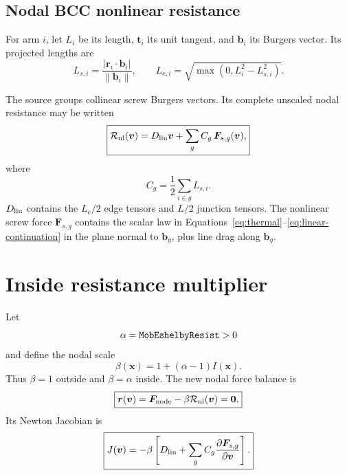 \documentclass[11pt]{article}
\newcommand{\vect}[1]{\bm{#1}}
\newcommand{\norm}[1]{\left\lVert #1\right\rVert}
\newcommand{\abs}[1]{\left\lvert #1\right\rvert}
\newcommand{\code}[1]{\texttt{\detokenize{#1}}}
\begin{document}
\subsection{Nodal BCC nonlinear resistance}

For arm \(i\), let \(L_i\) be its length, \(\vect{t}_i\) its unit tangent,
and \(\vect b_i\) its Burgers vector.  Its projected lengths are
\begin{equation}
 L_{s,i}=\frac{\abs{\vect r_i\mathbin{\cdot}\vect b_i}}
                     {\norm{\vect b_i}},
 \qquad
 L_{e,i}=\sqrt{\max(0,L_i^2-L_{s,i}^2)}.
\end{equation}

The source groups collinear screw Burgers vectors.  Its complete unscaled
nodal resistance may be written
\begin{equation}
 \boxed{
 \mathcal R_{\rm nl}(\vect v)
 =D_{\rm lin}\vect v+
  \sum_g C_g\,\vect F_{s,g}(\vect v),}
 \label{eq:base-resistance}
\end{equation}
where
\begin{equation}
 C_g=\frac12\sum_{i\in g}L_{s,i}.
\end{equation}
\(D_{\rm lin}\) contains the \(L_e/2\) edge tensors and \(L/2\) junction
tensors.  The nonlinear screw force \(\vect F_{s,g}\) contains the scalar law
in Equations~\eqref{eq:thermal}--\eqref{eq:linear-continuation} in the plane
normal to \(\vect b_g\), plus line drag along \(\vect b_g\).

\section{Inside resistance multiplier}

Let
\begin{equation}
 \alpha=\code{MobEshelbyResist}>0
\end{equation}
and define the nodal scale
\begin{equation}
 \boxed{\beta(\vect{x})=1+(\alpha-1)I(\vect{x}).}
 \label{eq:beta}
\end{equation}
Thus \(\beta=1\) outside and \(\beta=\alpha\) inside.  The new nodal force
balance is
\begin{equation}
 \boxed{
 \vect r(\vect v)=
 \vect F_{\rm node}-\beta\mathcal R_{\rm nl}(\vect v)=\vect0.}
 \label{eq:residual}
\end{equation}
Its Newton Jacobian is
\begin{equation}
 \boxed{
 J(\vect v)=
 -\beta\left[
 D_{\rm lin}+
 \sum_g C_g\frac{\partial\vect F_{s,g}}{\partial\vect v}
 \right].}
 \label{eq:jacobian}
\end{equation}
\end{document}
